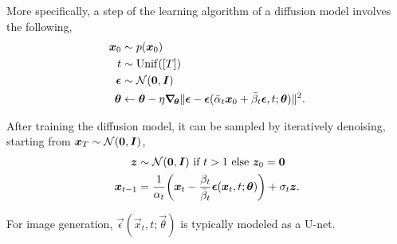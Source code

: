 More specifically, a step of the learning algorithm of a diffusion model involves the following,
\begin{align*}
    \bm{x}_0      & \sim p(\bm{x}_0)                                                                                                                                                 \\
    t              & \sim \mathrm{Unif}([T])                                                                                                                                           \\
    \bm{\epsilon} & \sim \mathcal{N}(\bm{0}, \bm{I})                                                                                                                                \\
    \bm{\theta}   & \gets \bm{\theta} - \eta \bm{\nabla}_{\! \bm{\theta}} \| \bm{\epsilon} - \bm{\epsilon}(\bar{\alpha}_t \bm{x}_0 + \bar{\beta}_t \bm{\epsilon}, t; \bm{\theta}) \|^2.
\end{align*}

After training the diffusion model, it can be sampled by iteratively denoising, starting from
$\bm{x}_T \sim \mathcal{N}(\bm{0}, \bm{I})$,
\begin{align*}
    \vec{z}       & \sim \mathcal{N}(\vec{0}, \mat{I}) \text{ if $t > 1$ else } \vec{z}_0 = \vec{0}                                                           \\
    \vec{x}_{t-1} & = \frac{1}{\alpha_t} \lft( \vec{x}_t - \frac{\beta_t}{\bar{\beta}_t} \vec{\epsilon}(\vec{x}_t, t; \vec{\theta}) \rgt) + \sigma_t \vec{z}.
\end{align*}

For image generation, $\vec{\epsilon}(\vec{x}_t, t; \vec{\theta})$ is typically modeled as a U-net.
